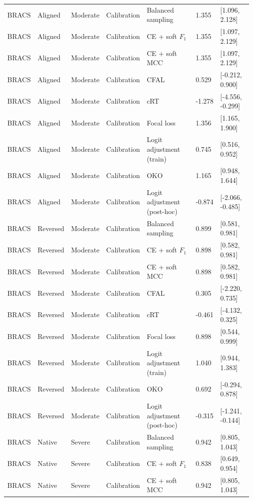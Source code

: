 \begin{longtable}{lllllll}
BRACS & Aligned & Moderate & Calibration & Balanced sampling & 1.355 & [1.096, 2.128] \\
BRACS & Aligned & Moderate & Calibration & CE + soft $F_1$ & 1.355 & [1.097, 2.129] \\
BRACS & Aligned & Moderate & Calibration & CE + soft MCC & 1.355 & [1.097, 2.129] \\
BRACS & Aligned & Moderate & Calibration & CFAL & 0.529 & [-0.212, 0.900] \\
BRACS & Aligned & Moderate & Calibration & cRT & -1.278 & [-4.556, -0.299] \\
BRACS & Aligned & Moderate & Calibration & Focal loss & 1.356 & [1.165, 1.900] \\
BRACS & Aligned & Moderate & Calibration & Logit adjustment (train) & 0.745 & [0.516, 0.952] \\
BRACS & Aligned & Moderate & Calibration & OKO & 1.165 & [0.948, 1.644] \\
BRACS & Aligned & Moderate & Calibration & Logit adjustment (post-hoc) & -0.874 & [-2.066, -0.485] \\
BRACS & Reversed & Moderate & Calibration & Balanced sampling & 0.899 & [0.581, 0.981] \\
BRACS & Reversed & Moderate & Calibration & CE + soft $F_1$ & 0.898 & [0.582, 0.981] \\
BRACS & Reversed & Moderate & Calibration & CE + soft MCC & 0.898 & [0.582, 0.981] \\
BRACS & Reversed & Moderate & Calibration & CFAL & 0.305 & [-2.220, 0.735] \\
BRACS & Reversed & Moderate & Calibration & cRT & -0.461 & [-4.132, 0.325] \\
BRACS & Reversed & Moderate & Calibration & Focal loss & 0.898 & [0.544, 0.999] \\
BRACS & Reversed & Moderate & Calibration & Logit adjustment (train) & 1.040 & [0.944, 1.383] \\
BRACS & Reversed & Moderate & Calibration & OKO & 0.692 & [-0.294, 0.878] \\
BRACS & Reversed & Moderate & Calibration & Logit adjustment (post-hoc) & -0.315 & [-1.241, -0.144] \\
BRACS & Native & Severe & Calibration & Balanced sampling & 0.942 & [0.805, 1.043] \\
BRACS & Native & Severe & Calibration & CE + soft $F_1$ & 0.838 & [0.649, 0.954] \\
BRACS & Native & Severe & Calibration & CE + soft MCC & 0.942 & [0.805, 1.043] \\

\end{longtable}
